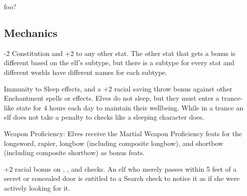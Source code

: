 
foo?

\subsection{Mechanics}

\begin{itemize*}
\item {}
\item {}
\item {}
\item {}
\item -2 Constitution and +2 to any other stat. The other stat that gets a bonus is different based on the elf's subtype, but there is a subtype for every stat and different worlds have different names for each subtype.
\item Immunity to Sleep effects, and a +2 racial saving throw bonus against other Enchantment spells or effects. Elves do not sleep, but they must enter a trance-like state for 4 hours each day to maintain their wellbeing. While in a trance an elf does not take a penalty to  checks like a sleeping character does.
\item Weapon Proficiency: Elves receive the Martial Weapon Proficiency feats for the longsword, rapier, longbow (including composite longbow), and shortbow (including composite shortbow) as bonus feats.
\item +2 racial bonus on , , and  checks. An elf who merely passes within 5 feet of a secret or concealed door is entitled to a Search check to notice it as if she were actively looking for it.
\item {}
\item {}
\item {}
\end{itemize*}
